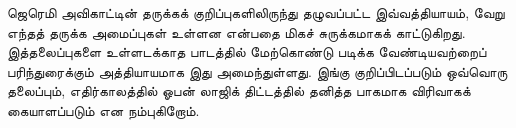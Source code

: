 \documentclass[../../../include/open-logic-chapter]{subfiles}
\begin{document}


\begin{editorial}
  ஜெரெமி அவிகாட்டின் தருக்கக் குறிப்புகளிலிருந்து தழுவப்பட்ட இவ்வத்தியாயம்,
  வேறு எந்தத் தருக்க அமைப்புகள் உள்ளன என்பதை மிகச் சுருக்கமாகக்
  காட்டுகிறது. இத்தலைப்புகளை உள்ளடக்காத பாடத்தில் மேற்கொண்டு படிக்க
  வேண்டியவற்றைப் பரிந்துரைக்கும் அத்தியாயமாக இது அமைந்துள்ளது. இங்கு
  குறிப்பிடப்படும் ஒவ்வொரு தலைப்பும், எதிர்காலத்தில் ஓபன் லாஜிக்
  திட்டத்தில் தனித்த பாகமாக விரிவாகக் கையாளப்படும் என நம்புகிறோம்.
\end{editorial}








\OLEndChapterHook
\end{document}

